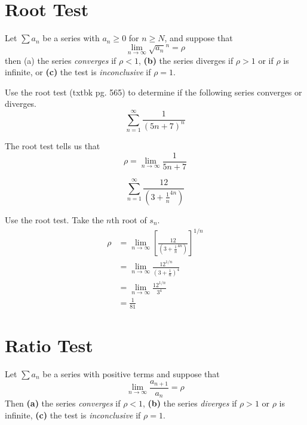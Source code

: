 \section{Root Test}

\begin{theorem}
  Let \(\sum a_n\) be a series with \( a_n \geq 0\) for \(n \geq N\), and
  suppose that
  \[ \lim_{n \to \infty} \sqrt{a_n}^n = \rho \]
  then (a) the series \emph{converges} if \(\rho < 1 \), \textbf{(b)} the series
  diverges if \( \rho > 1\) or if \(\rho\) is infinite, or \textbf{(c)} the test
  is \emph{inconclusive} if \(\rho = 1\).
  \label{th:roottest}
\end{theorem}

\begin{ex}
  Use the root test (txtbk pg. 565) to determine if the following series converges or diverges.
  \[ \sum_{n=1}^\infty \frac{1}{\left( 5n+7 \right)^n} \]
  \begin{sol}
    The root test tells us that
    \[ \rho = \lim_{n \to \infty} \frac{1}{5n+7} \]
  \end{sol}
\end{ex}
\begin{ex}
  \[ \sum_{n=1}^{\infty} \frac{12}{\left( 3+\frac{1}{n}^{4n} \right)} \]
  \begin{sol}
    Use the root test. Take the \(n\)th root of \(s_n\).
    \begin{align*}
      \rho &= \lim_{n \to \infty} \left[ \frac{12}{ \left( 3+\frac{1}{n}^{4n} \right) }\right]^{1/n} \\
      &= \lim_{n \to \infty} \frac{12^{1/n}}{\left( 3+\frac{1}{n} \right)^4}
      \\
      &= \lim_{n \to \infty} \frac{12^{1/n}}{3^4} \\
      &= \frac{1}{81}
    \end{align*}
  \end{sol}
\end{ex}


\section{Ratio Test}

\begin{theorem}\label{th:seriesratio}
  Let $\sum a_n$ be a series with positive terms and suppose that
  \[ \lim_{n \to \infty} \frac{a_{n+1}}{a_n}=\rho \]
  Then \textbf{(a)} the series \emph{converges} if $\rho < 1$, \textbf{(b)} the
  series \emph{diverges} if $\rho > 1$ or $\rho$ is infinite, \textbf{(c)} the
  test is \emph{inconclusive} if $\rho = 1$.
\end{theorem}

